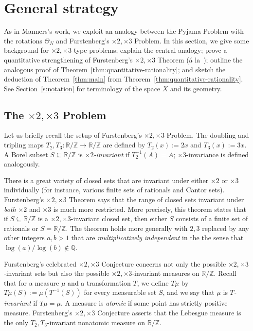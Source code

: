 \documentclass[11pt]{amsart}
\theoremstyle{definition}
\begin{document}
\section{General strategy}\label{sec:overview}

As in Manners's work, we exploit an analogy between the Pyjama Problem with the rotations $\Theta_N$ and Furstenberg's $\times 2, \times 3$ Problem.  In this section, we give some background for $\times 2, \times 3$-type problems; explain the central analogy; prove a quantitative strengthening of Furstenberg's $\times 2, \times 3$ Theorem (\'a la~\cite{BLMV08}); outline the analogous proof of Theorem~\ref{thm:quantitative-rationality}; and sketch the deduction of Theorem~\ref{thm:main} from Theorem~\ref{thm:quantitative-rationality}.  See Section~\ref{s:notation} for terminology of the space $X$ and its geometry.

\subsection{The $\times 2, \times 3$ Problem}
Let us briefly recall the setup of Furstenberg's $\times 2, \times 3$ Problem.  The doubling and tripling maps $T_2, T_3:\mathbb{R}/\mathbb{Z} \to \mathbb{R}/\mathbb{Z}$ are defined by $T_2(x):=2x$ and $T_3(x):=3x$.  A Borel subset $S \subseteq \mathbb{R}/\mathbb{Z}$ is \emph{$\times 2$-invariant} if $T_2^{-1}(A)=A$; $\times 3$-invariance is defined analogously.

There is a great variety of closed sets that are invariant under either $\times 2$ or $\times 3$ individually (for instance, various finite sets of rationals and Cantor sets).  Furstenberg's $\times 2, \times 3$ Theorem says that the range of closed sets invariant under \emph{both} $\times 2$ and $\times 3$ is much more restricted.  More precisely, this theorem states that if $S \subseteq \mathbb{R}/\mathbb{Z}$ is a $\times 2, \times 3$-invariant closed set, then either $S$ consists of a finite set of rationals or $S=\mathbb{R}/\mathbb{Z}$.  The theorem holds more generally with $2,3$ replaced by any other integers $a,b>1$ that are \emph{multiplicatively independent} in the the sense that $\log(a)/\log(b) \notin \mathbb{Q}$.

Furstenberg's celebrated $\times 2, \times 3$ Conjecture concerns not only the possible $\times 2, \times 3$-invariant sets but also the possible $\times 2, \times 3$-invariant measures on $\mathbb{R}/\mathbb{Z}$.  Recall that for a measure $\mu$ and a transformation $T$, we define $T\mu$ by $T\mu(S):=\mu(T^{-1}(S))$ for every measurable set $S$, and we say that $\mu$ is \emph{$T$-invariant} if $T\mu=\mu$.  A measure is \emph{atomic} if some point has strictly positive measure.  Furstenberg's $\times 2, \times 3$ Conjecture asserts that the Lebesgue measure is the only $T_2,T_3$-invariant nonatomic measure on $\mathbb{R}/\mathbb{Z}$.
\end{document}
